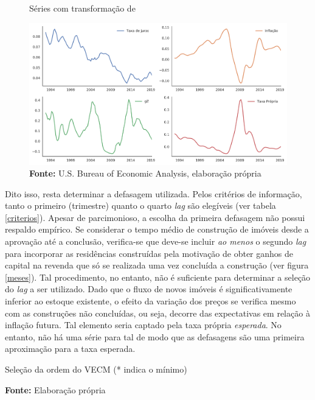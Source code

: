 \begin{figure}[htb]
	\centering
	\caption{Séries com transformação de \textcite{yeo_new_2000}}
	\label{YeoJhonson}
	\includegraphics[width=\textwidth]{../../Dados/Fatos_Estilizados/figs/YeoJohnson_All.png}
	\caption*{\textbf{Fonte:} U.S. Bureau of Economic Analysis, elaboração própria}
\end{figure}


Dito isso, resta determinar a defasagem utilizada. Pelos critérios de informação, tanto o primeiro (trimestre) quanto o quarto \textit{lag} são elegíveis (ver tabela \ref{criterios}). Apesar de parcimonioso, a escolha da primeira defasagem não possui respaldo empírico. Se considerar o tempo médio de construção de imóveis desde a aprovação até a conclusão, verifica-se que deve-se incluir \textit{ao menos} o segundo \textit{lag} para incorporar as residências construídas pela motivação de obter ganhos de capital na revenda que só se realizada uma vez concluída a construção (ver figura \ref{meses}). Tal procedimento, no entanto, não é suficiente para determinar a seleção do \textit{lag} a ser utilizado. Dado que o fluxo de novos imóveis é significativamente inferior ao estoque existente, o efeito da variação dos preços se verifica mesmo com as construções não concluídas, ou seja, decorre das expectativas em relação à inflação futura.  Tal elemento seria captado pela taxa própria \textit{esperada}. No entanto, não há uma série para tal de modo que as defasagens são uma primeira aproximação para a taxa esperada.


\begin{table}[htb]
	\caption{Seleção da ordem do VECM (* indica o mínimo)}
	\label{criterios}

\caption*{\textbf{Fonte:} Elaboração própria}
\end{table}



